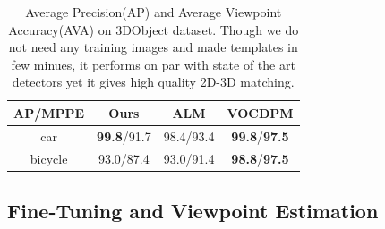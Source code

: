 \documentclass[10pt,twocolumn,letterpaper]{article}
\begin{document}
\begin{table}[!htbp]
  \begin{center}
    \begin{tabular}{|c|c|c|c|}
    \hline
     AP/MPPE& Ours & ALM\cite{Xiang12} & VOCDPM\cite{Pepik12} \\
    \hline\hline
    car & \textbf{99.8}/91.7 &  98.4/93.4 & \textbf{99.8}/\textbf{97.5} \\ 
    bicycle & 93.0/87.4 & 93.0/91.4 & \textbf{98.8}/\textbf{97.5} \\
    \hline
    \end{tabular}
  \end{center}
  \caption{Average Precision(AP) and Average Viewpoint Accuracy(AVA) on 3DObject dataset. Though we do not need any training images and made templates in few minues, it performs on par with state of the art detectors yet it gives high quality 2D-3D matching.}
  \label{tab:3dobject}
\end{table}


% 

\subsection{Fine-Tuning and Viewpoint Estimation}
\end{document}
